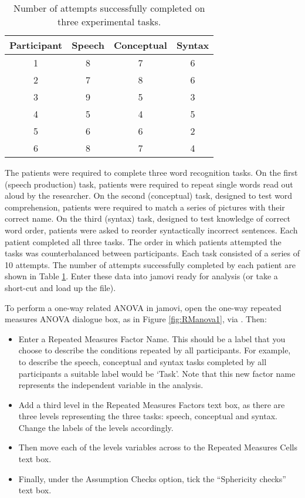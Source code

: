 \begin{table}[!ht]
\caption{Number of attempts successfully completed 
on three experimental tasks.} \label{tab:RManova} \tabcapsep
\begin{center}
\begin{tabular}{c|ccc} 
Participant	& Speech & 	Conceptual & Syntax \\ \hline
1 &	8 &	7 &	6 \\
2 &	7 &	8 &	6 \\
3 &	9 &	5 &	3 \\
4 &	5 &	4 &	5 \\
5 &	6 &	6 &	2 \\
6 &	8 &	7 &	4 \\
\end{tabular}
\tabcapsep \HR
\end{center}
\end{table}

The patients were required to complete three word recognition tasks. On the first (speech production) task, patients were required to repeat single words read out aloud by the researcher. On the second (conceptual) task, designed to test word comprehension, patients were required to match a series of pictures with their correct name. On the third (syntax) task, designed to test knowledge of correct word order, patients were asked to reorder syntactically incorrect sentences. Each patient completed all three tasks. The order in which patients attempted the tasks was counterbalanced between participants. Each task consisted of a series of 10 attempts. The number of attempts successfully completed by each patient are shown in Table \ref{tab:RManova}. Enter these data into jamovi ready for analysis (or take a short-cut and load up the  file). 

To perform a one-way related ANOVA in jamovi, open the one-way repeated measures ANOVA dialogue box, as in Figure \ref{fig:RManova1}, via . Then:
 
\begin{itemize} \itemsep -2pt
\item Enter a Repeated Measures Factor Name. This should be a label that you choose to describe the conditions repeated by all participants. For example, to describe the speech, conceptual and syntax tasks completed by all participants a suitable label would be ‘Task’. Note that this new factor name represents the independent variable in the analysis. 
\item Add a third level in the Repeated Measures Factors text box, as there are three levels representing the three tasks: speech, conceptual and syntax. Change the labels of the levels accordingly.
\item Then move each of the levels variables across to the Repeated Measures Cells text box.
\item Finally, under the Assumption Checks option, tick the “Sphericity checks” text box.
\end{itemize}

